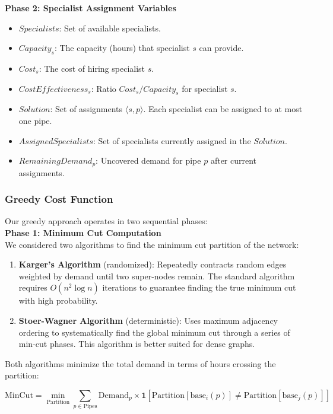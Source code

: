 \documentclass{article}
\begin{document}
\textbf{Phase 2: Specialist Assignment Variables}
\begin{itemize}
    \item $Specialists$: Set of available specialists.
    \item $Capacity_s$: The capacity (hours) that specialist $s$ can provide.
    \item $Cost_s$: The cost of hiring specialist $s$.
    \item $CostEffectiveness_s$: Ratio $Cost_s / Capacity_s$ for specialist $s$.
    \item $Solution$: Set of assignments $\langle s, p \rangle$. Each specialist can be assigned to at most one pipe.
    \item $AssignedSpecialists$: Set of specialists currently assigned in the $Solution$.
    \item $RemainingDemand_p$: Uncovered demand for pipe $p$ after current assignments.
\end{itemize}

\subsubsection{Greedy Cost Function}

Our greedy approach operates in two sequential phases:
\\[0.2cm]

\textbf{Phase 1: Minimum Cut Computation}
\\[0.2cm]
We considered two algorithms to find the minimum cut partition of the network:

\begin{enumerate}
    \item \textbf{Karger's Algorithm} (randomized): Repeatedly contracts random edges weighted by demand until two super-nodes remain. The standard algorithm requires $O(n^2 \log n)$ iterations to guarantee finding the true minimum cut with high probability.

    \item \textbf{Stoer-Wagner Algorithm} (deterministic): Uses maximum adjacency ordering to systematically find the global minimum cut through a series of min-cut phases. This algorithm is better suited for dense graphs.
\end{enumerate}

Both algorithms minimize the total demand in terms of hours crossing the partition:

\begin{equation}
\text{MinCut} = \min_{\text{Partition}} \sum_{p \in \text{Pipes}} \text{Demand}_p \times \mathbf{1}[\text{Partition}[\text{base}_i(p)] \neq \text{Partition}[\text{base}_j(p)]]
\end{equation}
\end{document}
